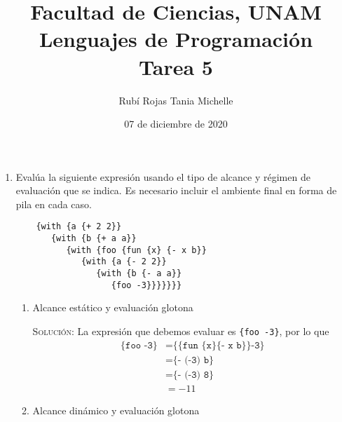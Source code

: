 \documentclass[letterpaper,11pt]{article}
\title{Facultad de Ciencias, UNAM \\ 
       Lenguajes de Programación\\ 
       Tarea 5}
\author{Rubí Rojas Tania Michelle}
\date{07 de diciembre de 2020}
\begin{document}
\maketitle

\begin{enumerate}
    \item Evalúa la siguiente expresión usando el tipo de alcance y régimen de 
    evaluación que se indica. Es necesario incluir el ambiente final en forma 
    de pila en cada caso. 
    \begin{verbatim}
    {with {a {+ 2 2}}
       {with {b {+ a a}}
          {with {foo {fun {x} {- x b}}
             {with {a {- 2 2}}
                {with {b {- a a}}
                   {foo -3}}}}}}}
    \end{verbatim}

    \begin{enumerate}
        \item Alcance estático y evaluación glotona

        \textsc{Solución:} La expresión que debemos evaluar es 
        \texttt{\{foo -3\}}, por lo que 
        \begin{align*}
            \texttt{\{foo -3\}} 
            &= \texttt{\{\{fun \{x\} \{- x b\}\} -3\}} \\
            &= \texttt{\{- (-3) b\}} \\
            &= \texttt{\{- (-3) 8\}} \\
            &= -11
        \end{align*}
        \begin{center}
            \begin{drawstack}[scale=1.15]
            \end{drawstack}
        \end{center}

        \item Alcance dinámico y evaluación glotona 


\end{enumerate}
\end{enumerate}
\end{document}
